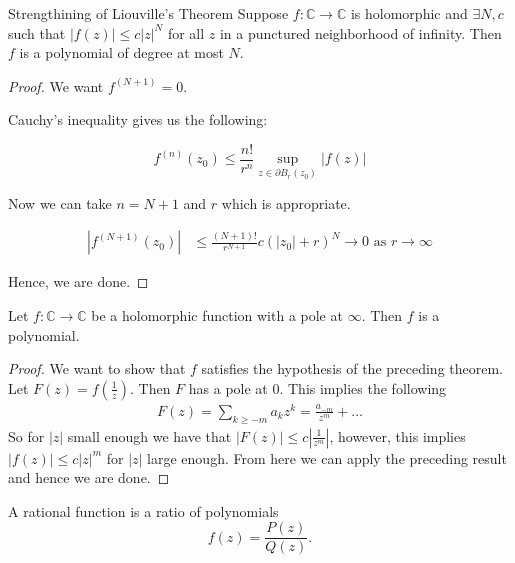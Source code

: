 \documentclass{article}
\begin{document}
\begin{misc}{Strengthining of Liouville's Theorem}{}
Suppose \( f:\mathbb{C} \to \mathbb{C}  \) is holomorphic and \( \exists  N,c \) such that \( |f(z)| \leq c |z|^N \) for all \( z \) in a punctured neighborhood of infinity. Then \( f \) is a polynomial of degree at most \( N \).  
\tcbline
\begin{proof}
We want \( f^{(N + 1)} = 0. \) 

Cauchy's inequality gives us the following:

\[
    f^{(n)}(z_0) \leq \frac{n!}{r^n}  \sup _{z \in \partial B_{r}(z_0) }\left\lvert f(z) \right\rvert 
\]

Now we can take \( n = N + 1 \) and \( r \) which is appropriate. 

\begin{align*}
    \left\lvert f^{(N + 1)}(z_0) \right\rvert &\leq \frac{(N + 1)!}{r^{N+ 1} }c(|z_0|+ r)^N \to 0 \text{ as } r \to \infty  
\end{align*}

Hence, we are done. 
\end{proof}

\end{misc}
\begin{cor}{}{}
Let \( f: \mathbb{C} \to \mathbb{C}  \) be a holomorphic function with a pole at \( \infty  \). Then \( f \) is a polynomial. 

\tcbline

\begin{proof}
We want to show that \( f \) satisfies the hypothesis of the preceding theorem. Let \( F(z ) = f(\frac{1}{z}) \). Then \( F \) has a pole at \( 0 \). This implies the following
\begin{align*}
    F(z) = \sum_{k\geq - m}a_{k} z^k = \frac{a_ {- m}}{z^m} + \dots 
\end{align*}
So for \( |z| \) small enough we have that \( |F(z) |\leq c|\frac{1}{z^m}| \), however, this implies \( |f(z)| \leq c|z|^m \) for \( |z| \) large enough. From here we can apply the preceding result and hence we are done. 
\end{proof}

\end{cor}

\begin{defn}{}{}
A rational function is a ratio of polynomials
\[ f(z) = \frac{P(z)}{Q(z)}.  \]
\end{defn}
\end{document}
